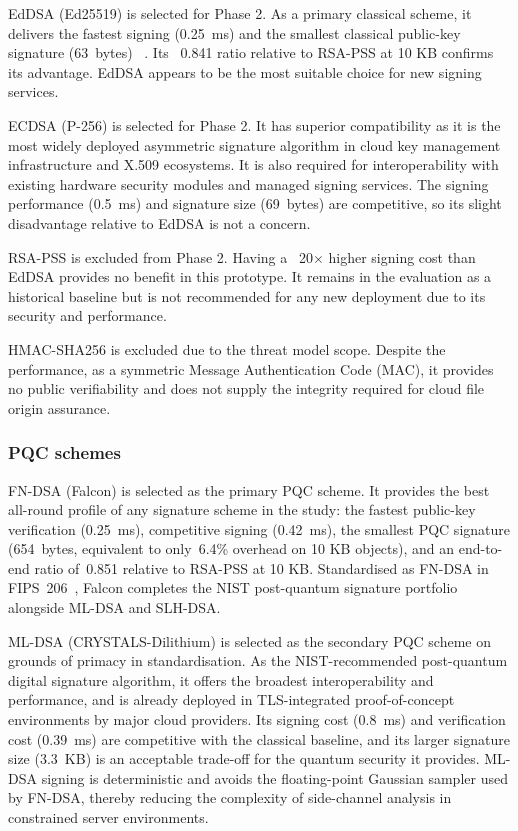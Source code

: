 \documentclass[12pt,a4paper]{article}
\begin{document}
EdDSA (Ed25519) is selected for Phase 2. As a primary classical scheme, it delivers the fastest signing (0.25~ms) and the smallest classical public-key signature (63~bytes) ~\cite{nist-fips-186-5-2023}. Its ~0.841 ratio relative to RSA-PSS at 10 KB confirms its advantage. EdDSA appears to be the most suitable choice for new signing services.

ECDSA (P-256) is selected for Phase 2. It has superior compatibility as it is the most widely deployed asymmetric signature algorithm in cloud key management infrastructure and X.509 ecosystems. It is also required for interoperability with existing hardware security modules and managed signing services. The signing performance (0.5~ms) and signature size (69~bytes) are competitive, so its slight disadvantage relative to EdDSA is not a concern.

RSA-PSS is excluded from Phase 2. Having a ~20$\times$ higher signing cost than EdDSA provides no benefit in this prototype. It remains in the evaluation as a historical baseline but is not recommended for any new deployment due to its security and performance.

HMAC-SHA256 is excluded due to the threat model scope. Despite the performance, as a symmetric Message Authentication Code (MAC), it provides no public verifiability and does not supply the integrity required for cloud file origin assurance.

\subsubsection{PQC schemes}

FN-DSA (Falcon) is selected as the primary PQC scheme. It provides the best all-round profile of any signature scheme in the study: the fastest public-key verification (0.25~ms), competitive signing (0.42~ms), the smallest PQC signature (654~bytes, equivalent to only~6.4\% overhead on 10 KB objects), and an end-to-end ratio of~0.851 relative to RSA-PSS at 10 KB. Standardised as FN-DSA in FIPS~206~\cite{nist-fips206-2024}, Falcon completes the NIST post-quantum signature portfolio alongside ML-DSA and SLH-DSA.

ML-DSA (CRYSTALS-Dilithium) is selected as the secondary PQC scheme on grounds of primacy in standardisation. As the NIST-recommended post-quantum digital signature algorithm, it offers the broadest interoperability and performance, and is already deployed in TLS-integrated proof-of-concept environments by major cloud providers. Its signing cost (0.8~ms) and verification cost (0.39~ms) are competitive with the classical baseline, and its larger signature size (3.3~KB) is an acceptable trade-off for the quantum security it provides. ML-DSA signing is deterministic and avoids the floating-point Gaussian sampler used by FN-DSA, thereby reducing the complexity of side-channel analysis in constrained server environments.
\end{document}

